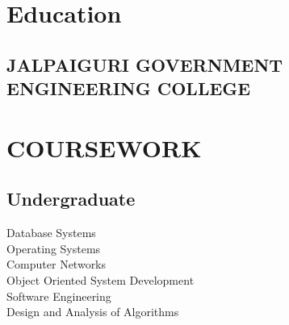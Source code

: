 \documentclass[]{deedy-resume-openfont}
\begin{document}
\begin{minipage}[t]{0.33\textwidth}
\sectionsep


\section{Education} 

\subsection{JALPAIGURI GOVERNMENT ENGINEERING COLLEGE}
\sectionsep

\section{COURSEWORK}
\subsection{Undergraduate}
Database Systems \\
Operating Systems \\
Computer Networks \\
Object Oriented System Development \\
Software Engineering \\
Design and Analysis of Algorithms \\
\sectionsep



%
%

\end{minipage} 
\hfill
\end{document}
